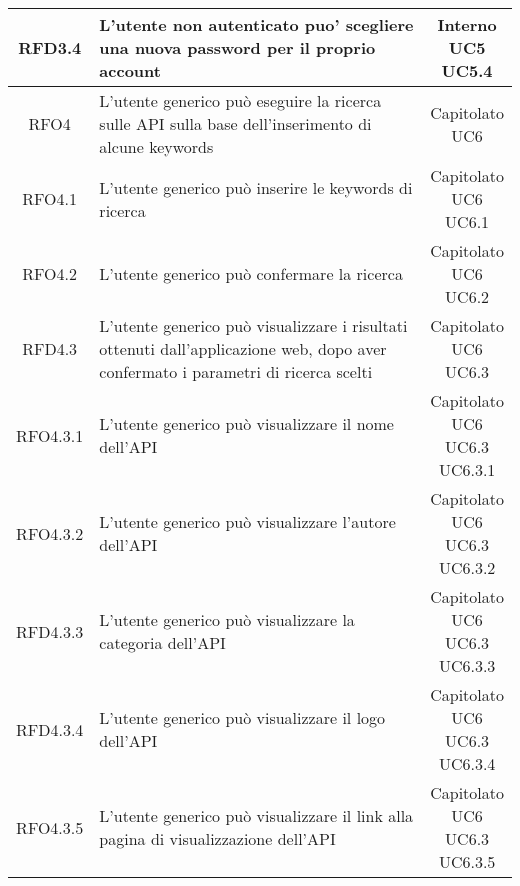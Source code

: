 \begin{longtable}{|c|p{8cm}|c|}
\hline
\hypertarget{RFD3.4}{RFD3.4} & L'utente non autenticato puo' scegliere una nuova password per il proprio account & \makecell*{Interno\\UC5\\UC5.4} \\
\hline

\hypertarget{RFO4}{RFO4} & L'utente generico può eseguire la ricerca sulle API sulla base dell'inserimento di alcune keywords & \makecell*{Capitolato\\UC6} \\
\hline

\hypertarget{RFO4.1}{RFO4.1} & L'utente generico può inserire le keywords di ricerca & \makecell*{Capitolato\\UC6\\UC6.1} \\
\hline
\hypertarget{RFO4.2}{RFO4.2} & L'utente generico può confermare la ricerca  & \makecell*{Capitolato\\UC6\\UC6.2} \\
\hline

\hypertarget{RFD4.3}{RFD4.3} & L'utente generico può visualizzare i risultati ottenuti dall'applicazione web, dopo aver confermato i parametri di ricerca scelti & \makecell*{Capitolato\\UC6\\UC6.3} \\
\hline
\hypertarget{RFO4.3.1}{RFO4.3.1} & L'utente generico può visualizzare il nome dell'API & \makecell*{Capitolato\\UC6\\UC6.3\\UC6.3.1} \\
\hline
\hypertarget{RFO4.3.2}{RFO4.3.2} & L'utente generico può visualizzare l'autore dell'API & \makecell*{Capitolato\\UC6\\UC6.3\\UC6.3.2} \\
\hline

\hypertarget{RFD4.3.3}{RFD4.3.3} & L'utente generico può visualizzare la categoria dell'API & \makecell*{Capitolato\\UC6\\UC6.3\\UC6.3.3} \\
\hline
\hypertarget{RFD4.3.4}{RFD4.3.4} & L'utente generico può visualizzare il logo dell'API & \makecell*{Capitolato\\UC6\\UC6.3\\UC6.3.4} \\
\hline
\hypertarget{RFO4.3.5}{RFO4.3.5} & L'utente generico può visualizzare il link alla pagina di visualizzazione dell'API & \makecell*{Capitolato\\UC6\\UC6.3\\UC6.3.5} \\
\hline


\end{longtable}
